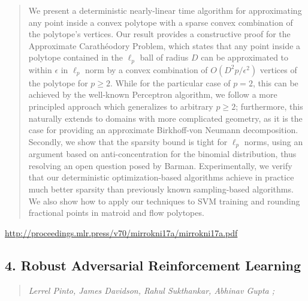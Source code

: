 \documentclass{article}
\begin{document}
\begin{quote}
    We present a deterministic nearly-linear time algorithm for approximating any point inside a convex polytope with a sparse convex combination of the polytope’s vertices. Our result provides a constructive proof for the Approximate Carathéodory Problem, which states that any point inside a polytope contained in the $\ell_p$ ball of radius $D$ can be approximated to within $\epsilon$ in $\ell_p$ norm by a convex combination of $O\left(D^2 p/\epsilon^2\right)$ vertices of the polytope for $p \geq 2$. While for the particular case of $p=2$, this can be achieved by the well-known Perceptron algorithm, we follow a more principled approach which generalizes to arbitrary $p\geq 2$; furthermore, this naturally extends to domains with more complicated geometry, as it is the case for providing an approximate Birkhoff-von Neumann decomposition. Secondly, we show that the sparsity bound is tight for $\ell_p$ norms, using an argument based on anti-concentration for the binomial distribution, thus resolving an open question posed by Barman. Experimentally, we verify that our deterministic optimization-based algorithms achieve in practice much better sparsity than previously known sampling-based algorithms. We also show how to apply our techniques to SVM training and rounding fractional points in matroid and flow polytopes.  \end{quote}

\href{http://proceedings.mlr.press/v70/mirrokni17a/mirrokni17a.pdf}{http://proceedings.mlr.press/v70/mirrokni17a/mirrokni17a.pdf}

\subsection{4. Robust Adversarial Reinforcement Learning}

\begin{quote}
\footnotesize{\textit{Lerrel Pinto, James Davidson, Rahul Sukthankar, Abhinav Gupta ;}}
\end{quote}
\end{document}
